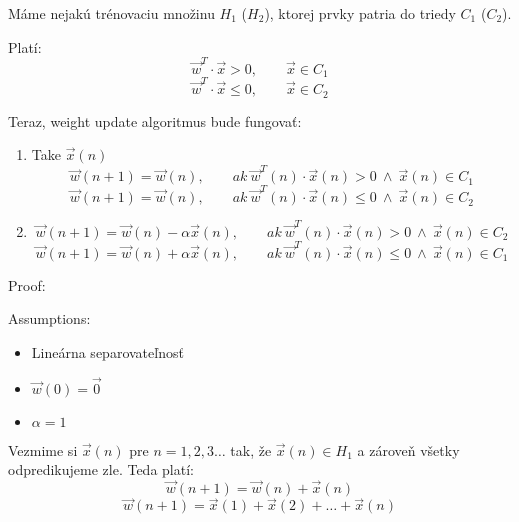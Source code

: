 \documentclass{article}
\numberwithin{equation}{section} %
\begin{document}
Máme nejakú trénovaciu množinu $H_1$ ($H_2$), ktorej prvky patria do triedy $C_1$ ($C_2$).

Platí:
$$\overrightarrow{w}^T \cdot \overrightarrow{x} > 0, \qquad \overrightarrow{x} \in C_1$$
$$\overrightarrow{w}^T \cdot \overrightarrow{x} \leq 0, \qquad \overrightarrow{x} \in C_2$$

Teraz, weight update algoritmus bude fungovať:
\begin{enumerate}
\item Take $\overrightarrow{x}(n)$
$$\overrightarrow{w}(n+1) = \overrightarrow{w}(n),\qquad ak~ \overrightarrow{w}^T(n)\cdot\overrightarrow{x}(n) > 0 ~\land~ \overrightarrow{x}(n) \in C_1$$
$$\overrightarrow{w}(n+1) = \overrightarrow{w}(n),\qquad ak~ \overrightarrow{w}^T(n)\cdot\overrightarrow{x}(n) \leq 0 ~\land~ \overrightarrow{x}(n) \in C_2$$
\item 
$$\overrightarrow{w}(n+1) = \overrightarrow{w}(n) - \alpha\overrightarrow{x}(n),\qquad ak~ \overrightarrow{w}^T(n)\cdot\overrightarrow{x}(n) > 0 ~\land~ \overrightarrow{x}(n) \in C_2$$
$$\overrightarrow{w}(n+1) = \overrightarrow{w}(n) + \alpha\overrightarrow{x}(n),\qquad ak~ \overrightarrow{w}^T(n)\cdot\overrightarrow{x}(n) \leq 0 ~\land~ \overrightarrow{x}(n) \in C_1$$
\end{enumerate}

Proof: 

Assumptions:
\begin{itemize}
\item Lineárna separovateľnosť
\item $\overrightarrow{w}(0) = \overrightarrow{0}$
\item $\alpha = 1$
\end{itemize}

Vezmime si $\overrightarrow{x}(n)$ pre $n = 1,2,3 \ldots$ tak, že $\overrightarrow{x}(n) \in H_1$ a zároveň všetky odpredikujeme zle. Teda platí:
$$\overrightarrow{w}(n+1) = \overrightarrow{w}(n) + \overrightarrow{x}(n)$$
\begin{equation}\label{eq:1}
\overrightarrow{w}(n+1) = \overrightarrow{x}(1) + \overrightarrow{x}(2) + \ldots + \overrightarrow{x}(n)
\end{equation}
\end{document}
